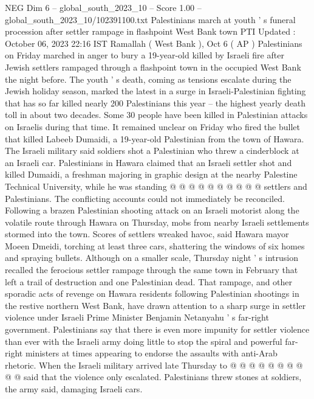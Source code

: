 \begin{textsample}{NEG Dim 6 – global\_south\_2023\_10 – Score 1.00 – global\_south\_2023\_10/102391100.txt}  \label{ex:f6_neg_155}
Palestinians march at youth ' s funeral procession after settler rampage in flashpoint West Bank town PTI Updated : October 06, 2023 22:16 IST Ramallah ( West Bank ), Oct 6 ( AP ) Palestinians on Friday marched in anger to bury a 19-year-old killed by Israeli fire after Jewish settlers rampaged through a flashpoint town in the occupied West Bank the night before.
The youth ' s death, coming as tensions escalate during the Jewish holiday season, marked the latest in a surge in Israeli-Palestinian fighting that has so far killed nearly 200 Palestinians this year -- the highest yearly death toll in about two decades.
Some 30 people have been killed in Palestinian attacks on Israelis during that time.
It remained unclear on Friday who fired the bullet that killed Labeeb Dumaidi, a 19-year-old Palestinian from the town of Hawara.
The Israeli military said soldiers shot a Palestinian who threw a cinderblock at an Israeli car.
Palestinians in Hawara claimed that an Israeli settler shot and killed Dumaidi, a freshman majoring in graphic design at the nearby Palestine Technical University, while he was standing @ @ @ @ @ @ @ @ @ @ settlers and Palestinians.
The conflicting accounts could not immediately be reconciled.
Following a brazen Palestinian shooting attack on an Israeli motorist along the volatile route through Hawara on Thursday, mobs from nearby Israeli settlements stormed into the town.
Scores of settlers wreaked havoc, said Hawara mayor Moeen Dmeidi, torching at least three cars, shattering the windows of six homes and spraying bullets.
Although on a smaller scale, Thursday night ' s intrusion recalled the ferocious settler rampage through the same town in February that left a trail of destruction and one Palestinian dead.
That rampage, and other sporadic acts of revenge on Hawara residents following Palestinian shootings in the restive northern West Bank, have drawn attention to a sharp surge in settler violence under Israeli Prime Minister Benjamin Netanyahu ' s far-right government.
Palestinians say that there is even more impunity for settler violence than ever with the Israeli army doing little to stop the spiral and powerful far-right ministers at times appearing to endorse the assaults with anti-Arab rhetoric.
When the Israeli military arrived late Thursday to @ @ @ @ @ @ @ @ @ @ said that the violence only escalated.
Palestinians threw stones at soldiers, the army said, damaging Israeli cars.

\end{textsample}
